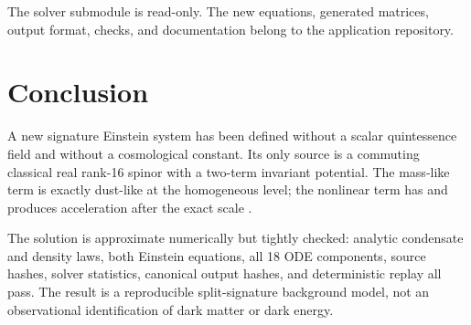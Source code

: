\documentclass[11pt]{article}
\begin{document}
The solver submodule is read-only. The new equations, generated matrices, output format, checks, and documentation belong to the application repository.

\section{Conclusion}

A new signature \texttt{} Einstein system has been defined without a scalar quintessence field and without a cosmological constant. Its only source is a commuting classical real rank-16 \texttt{} spinor with a two-term invariant potential. The mass-like term is exactly dust-like at the homogeneous level; the nonlinear term has \texttt{} and produces acceleration after the exact scale \texttt{}.

The solution is approximate numerically but tightly checked: analytic condensate and density laws, both Einstein equations, all 18 ODE components, source hashes, solver statistics, canonical output hashes, and deterministic replay all pass. The result is a reproducible split-signature background model, not an observational identification of dark matter or dark energy.
\end{document}
